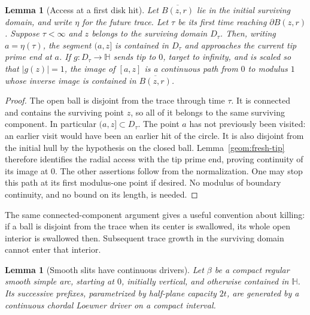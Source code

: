 \documentclass[11pt]{article}
\newtheorem{lemma}[theorem]{Lemma}
\theoremstyle{definition}
\theoremstyle{remark}
\numberwithin{equation}{section}
\begin{document}
\begin{lemma}[Access at a first disk hit]
\label{geom:first-hit-access}
Let $\overline{B(z,r)}$ lie in the initial surviving domain, and write
$\eta$ for the future trace. Let $\tau$ be its first time reaching
$\partial B(z,r)$.
Suppose $\tau<\infty$ and $z$ belongs to the surviving domain $D_\tau$.
Then, writing $a=\eta(\tau)$, the segment $(a,z]$ is contained in
$D_\tau$ and approaches the current tip prime end at $a$.
If $g:D_\tau\to\mathbb H$ sends tip to $0$, target to infinity,
and is scaled so that $|g(z)|=1$, the image of $[a,z]$ is a continuous
path from $0$ to modulus $1$ whose inverse image is contained in
$\overline{B(z,r)}$.
\end{lemma}

\begin{proof}
The open ball is disjoint from the trace through time $\tau$.
It is connected and contains the surviving point $z$, so all of it
belongs to the same surviving component.  In particular $(a,z]\subset
D_\tau$.  The point $a$ has not previously been visited: an earlier
visit would have been an earlier hit of the circle.  It is also
disjoint from the initial hull by the hypothesis on the closed ball.
Lemma~\ref{geom:fresh-tip} therefore identifies the radial access
with the tip prime end, proving continuity of its image at $0$.
The other assertions follow from the normalization.  One may stop this
path at its first modulus-one point if desired.  No modulus of boundary
continuity, and no bound on its length, is needed.
\end{proof}

The same connected-component argument gives a useful convention about
killing: if a ball is disjoint from the trace when its center is
swallowed, its whole open interior is swallowed then.  Subsequent
trace growth in the surviving domain cannot enter that interior.

\begin{lemma}[Smooth slits have continuous drivers]
\label{geom:smooth-driver}
Let $\beta$ be a compact regular smooth simple arc, starting at $0$,
initially vertical, and otherwise contained in $\mathbb H$.  Its
successive prefixes, parametrized by half-plane capacity $2t$, are
generated by a continuous chordal Loewner driver on a compact interval.
\end{lemma}
\end{document}

